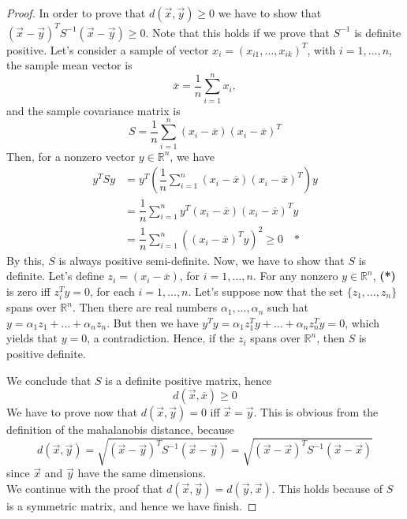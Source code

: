 \documentclass[11pt]{article}
\theoremstyle{definition}
\theoremstyle{remark}
\theoremstyle{remark}
\theoremstyle{remark}
\begin{document}
\begin{proof}
  In order to prove that $d(\vec{x},\vec{y}) \geq 0$ we have to show that
  $(\vec{x} - \vec{y})^{T}S^{-1}(\vec{x}-\vec{y})\geq 0$. Note that this holds
  if we prove that $S^{-1}$ is definite positive. Let's consider a sample of
  vector $x_{i} = (x_{i1},\ldots,x_{ik})^{T}$, with $i = 1,\ldots,n$, the sample
  mean vector is
  \[
    \overline{x} = \dfrac{1}{n} \sum_{i = 1}^{n} x_{i},
  \]
  and the sample covariance matrix is
  \[
    S = \dfrac{1}{n} \sum_{i = 1}^{n} (x_{i} - \overline{x})(x_{i}- \overline{x})^{T}
  \]
  Then, for a nonzero vector $y \in \mathbb{R}^{n}$, we have
  \begin{align*}
    y^{T}S y &= y^{T} \left ( \dfrac{1}{n} \sum_{i = 1}^{n} (x_{i} - \overline{x})(x_{i}- \overline{x})^{T} \right) y \\
             &= \dfrac{1}{n} \sum_{i = 1}^{n} y^{T} (x_{i} - \overline{x})(x_{i} - \overline{x})^{T} y \\
             &= \dfrac{1}{n} \sum_{i = 1}^{n} ((x_{i} - \overline{x})^{T}y)^{2} \geq 0 \quad \textbf{*}
  \end{align*}
  By this, $S$ is always positive semi-definite. Now, we have to show that $S$
  is definite. Let's define $z_{i} = (x_{i} - \overline{x})$, for
  $i = 1,\ldots,n$. For any nonzero $y \in \mathbb{R}^{n}$, \textbf{(*)} is zero
  iff $z_{i}^{T}y = 0$, for each $i = 1,\ldots,n$. Let's suppose now that the
  set $\{z_{1},\ldots,z_{n}\}$ spans over $\mathbb{R}^{n}$. Then there are real
  numbers $\alpha_{1},\ldots,\alpha_{n}$ such hat
  $y = \alpha_{1}z_{1} + \ldots + \alpha_{n}z_{n}$. But then we have
  $y^{T}y = \alpha_{1}z_{1}^{T}y + \ldots + \alpha_{n}z_{n}^{T}y = 0$, which
  yields that $y = 0$, a contradiction. Hence, if the $z_{i}$ spans over
  $\mathbb{R}^{n}$, then $S$ is positive definite.

  We conclude that $S$ is a definite positive matrix, hence
  \[
    d(\vec{x},\overline{x}) \geq 0
  \]
  We have to prove now that $d(\vec{x},\vec{y}) = 0$ iff $\vec{x} = \vec{y}$.
  This is obvious from the definition of the mahalanobis distance, because
  \[
    d(\vec{x},\vec{y}) = \sqrt{(\vec{x} - \vec{y})^{T}S^{-1}(\vec{x}-\vec{y})} = \sqrt{(\vec{x} - \vec{x})^{T}S^{-1}(\vec{x}-\vec{x})}
  \]
  since $\vec{x}$ and $\vec{y}$ have the same dimensions. \\

  We continue with the proof that $d(\vec{x},\vec{y}) = d(\vec{y},\vec{x})$.
  This holds because of $S$ is a symmetric matrix, and hence we have finish.


\end{proof}
\end{document}
